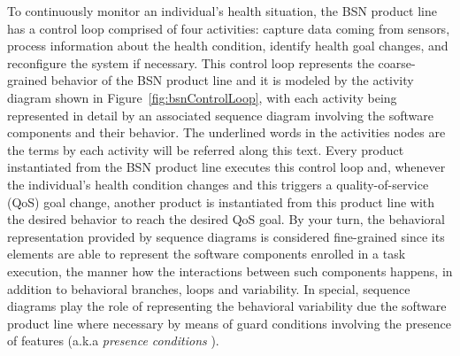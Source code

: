 To continuously monitor an individual's health situation, the BSN product line
has a control loop comprised of four activities: capture data coming from
sensors, process information about the health condition, identify health goal
changes, and reconfigure the system if necessary. This control loop represents
the coarse-grained behavior of the BSN product line and it is modeled by the
activity diagram shown in Figure~\ref{fig:bsnControlLoop}, with each activity
being represented in detail by an associated sequence diagram involving the
software components and their behavior. The underlined words in the activities
nodes are the terms by each activity will be referred along this text. Every
product instantiated from the BSN product line executes this control loop and,
whenever the individual's health condition changes and this triggers a
quality-of-service (QoS) goal change, another product is instantiated from this
product line with the desired behavior to reach the desired QoS goal.
By your turn, the behavioral representation provided by sequence diagrams is
considered fine-grained since its elements are able to represent the software
components enrolled in a task execution, the manner how the interactions
between such components happens, in addition to behavioral branches, loops and
variability.  In special, sequence diagrams play the role of representing the
behavioral variability due the software product line where necessary by means
of guard conditions involving the presence of features (a.k.a \emph{presence
conditions} \cite{czarnecki_verifying_2006}).

